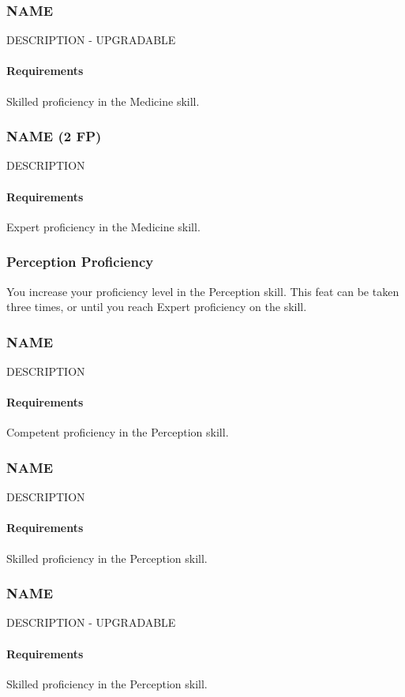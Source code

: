 \subsubsection{NAME} \label{feat::name}
    DESCRIPTION - UPGRADABLE
    \paragraph{Requirements} Skilled proficiency in the Medicine skill.
\subsubsection{NAME (2 FP)} \label{feat::name}
    DESCRIPTION
    \paragraph{Requirements} Expert proficiency in the Medicine skill.
\subsubsection{Perception Proficiency} \label{feat::perceptionprof}
    You increase your proficiency level in the Perception skill.
    This feat can be taken three times, or until you reach Expert proficiency on the skill.
\subsubsection{NAME} \label{feat::name}
    DESCRIPTION
    \paragraph{Requirements} Competent proficiency in the Perception skill.
\subsubsection{NAME} \label{feat::name}
    DESCRIPTION
    \paragraph{Requirements} Skilled proficiency in the Perception skill.
\subsubsection{NAME} \label{feat::name}
    DESCRIPTION - UPGRADABLE
    \paragraph{Requirements} Skilled proficiency in the Perception skill.
